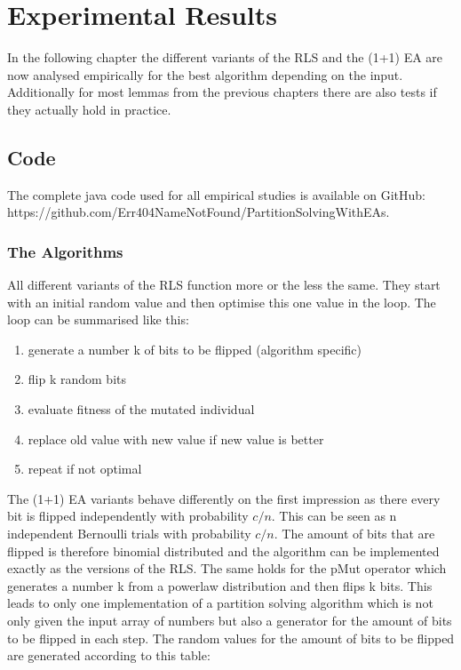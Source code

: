 \chapter{Experimental Results}\label{ch:expRes}

In the following chapter the different variants of the RLS and the (1+1) EA are now analysed empirically for the best algorithm depending on the input. Additionally for most lemmas from the previous chapters there are also tests if they actually hold in practice.

\section{Code}
The complete java code used for all empirical studies is available on GitHub:\newline
https://github.com/Err404NameNotFound/PartitionSolvingWithEAs.\newline
\subsection{The Algorithms}
All different variants of the RLS function more or the less the same. They start with an initial random value and then optimise this one value in the loop. The loop can be summarised like this:
\begin{enumerate}
      \item generate a number k of bits to be flipped (algorithm specific)
      \item flip k random bits
      \item evaluate fitness of the mutated individual
      \item replace old value with new value if new value is better
      \item repeat if not optimal
\end{enumerate}
The (1+1) EA variants behave differently on the first impression as there every bit is flipped independently with probability $c/n$. This can be seen as n independent Bernoulli trials with probability $c/n$. The amount of bits that are flipped is therefore binomial distributed and the algorithm can be implemented exactly as the versions of the RLS. The same holds for the pMut operator which generates a number k from a powerlaw distribution and then flips k bits. This leads to only one implementation of a partition solving algorithm which is not only given the input array of numbers but also a generator for the amount of bits to be flipped in each step. The random values for the amount of bits to be flipped are generated according to this table:

